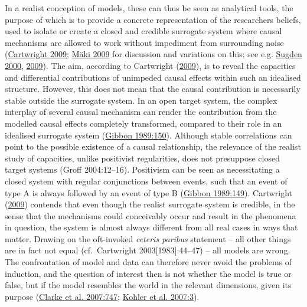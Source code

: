 \documentclass[
  a4paper,
  oneside]{uiophdthesis}
\begin{document}
In a realist conception of models, these can thus be seen as analytical tools, the purpose of which is to provide a concrete representation of the researchers beliefs, used to isolate or create a closed and credible surrogate system where causal mechanisms are allowed to work without impediment from surrounding noise (\protect\hyperlink{ref-cartwright2009}{Cartwright 2009}; \protect\hyperlink{ref-muxe4ki2009}{Mäki 2009} for discussion and variations on this; see e.g. \protect\hyperlink{ref-sugden2000}{Sugden 2000}, \protect\hyperlink{ref-sugden2009}{2009}). The aim, according to Cartwright (\protect\hyperlink{ref-cartwright2009}{2009}), is to reveal the capacities and differential contributions of unimpeded causal effects within such an idealised structure. However, this does not mean that the causal contribution is necessarily stable outside the surrogate system. In an open target system, the complex interplay of several causal mechanism can render the contribution from the modelled causal effects completely transformed, compared to their role in an idealised surrogate system (\protect\hyperlink{ref-gibbon1989}{Gibbon 1989:150}). Although stable correlations can point to the possible existence of a causal relationship, the relevance of the realist study of capacities, unlike positivist regularities, does not presuppose closed target systems (Groff 2004:12--16). Positivism can be seen as necessitating a closed system with regular conjunctions between events, such that an event of type A is always followed by an event of type B (\protect\hyperlink{ref-gibbon1989}{Gibbon 1989:149}). Cartwright (\protect\hyperlink{ref-cartwright2009}{2009}) contends that even though the realist surrogate system is credible, in the sense that the mechanisms could conceivably occur and result in the phenomena in question, the system is almost always different from all real cases in ways that matter. Drawing on the oft-invoked \emph{ceteris paribus} statement -- all other things are in fact not equal (cf.~Cartwright 2003{[}1983{]}:44--47) -- all models are wrong. The confrontation of model and data can therefore never avoid the problems of induction, and the question of interest then is not whether the model is true or false, but if the model resembles the world in the relevant dimensions, given its purpose (\protect\hyperlink{ref-clarke2007}{Clarke et al. 2007:747}; \protect\hyperlink{ref-kohler2007}{Kohler et al. 2007:3}).
\end{document}
